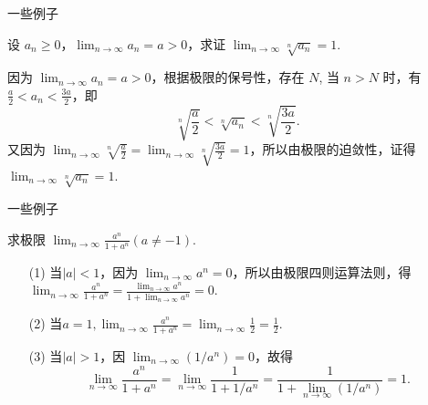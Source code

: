 \documentclass[mathserif]{beamer}
\begin{document}
\begin{frame}{一些例子}%
	\begin{ex}
		\suojin 设 $a_n \geq 0$，$\lim _{n \rightarrow \infty} a_n=a>0$，求证 $\lim _{n \rightarrow \infty} \sqrt[n]{a_n}=1$.
		\end{ex}
	\pause 
	\begin{proofs}
		\suojin 因为 $\lim _{n \rightarrow \infty} a_n=a>0$，根据极限的保号性，存在 $N$, 当 $n>N$ 时，有 $\frac{a}{2}<a_n<\frac{3 a}{2}$，即
	$$
	\sqrt[n]{\frac{a}{2}}<\sqrt[n]{a_n}<\sqrt[n]{\frac{3 a}{2}}.
	$$
	\suojin 又因为 $\lim _{n \rightarrow \infty} \sqrt[n]{\frac{a}{2}}=\lim _{n \rightarrow \infty} \sqrt[n]{\frac{3 a}{2}}=1$，所以由极限的迫敛性，证得 $\lim _{n \rightarrow \infty} \sqrt[n]{a_n}=1$.  
\end{proofs} 
\end{frame}



\begin{frame}{一些例子}%
	\begin{ex}
		\suojin 求极限 $\lim _{n \rightarrow \infty} \frac{a^n}{1+a^n}(a \neq-1)$.
	\end{ex} 
\pause 
	\begin{jie}
		\begin{itemize}
			\item[(1)]  当$|a|<1$，因为 $\lim _{n \rightarrow \infty} a^n=0$，所以由极限四则运算法则，得 $\lim _{n \rightarrow \infty} \frac{a^n}{1+a^n}=\frac{\lim _{n \rightarrow \infty} a^n}{1+\lim _{n \rightarrow \infty} a^n}=0$.
			\item[(2)] 当$a=1, \lim _{n \rightarrow \infty} \frac{a^n}{1+a^n}=\lim _{n \rightarrow \infty} \frac{1}{2}=\frac{1}{2}$.
			\item[(3)] 当$|a|>1$，因 $\lim _{n \rightarrow \infty}\left(1 / a^n\right)=0$，故得
			$$
			\lim _{n \rightarrow \infty} \frac{a^n}{1+a^n}=\lim _{n \rightarrow \infty} \frac{1}{1+1 / a^n}=\frac{1}{1+\lim _{n \rightarrow \infty}\left(1 / a^n\right)}=1 .
			$$   
		\end{itemize}
	\end{jie}
\end{frame}
\end{document}
